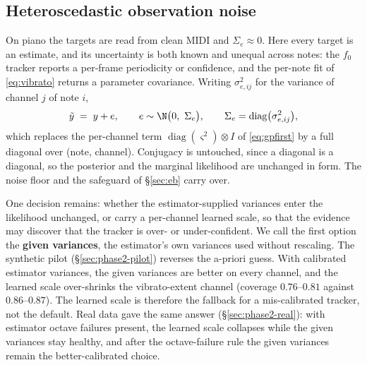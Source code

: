 \subsection{Heteroscedastic observation noise}
On piano the targets are read from clean MIDI and $\Sigma_e \approx 0$.
Here every target is an estimate, and its uncertainty is both known and
unequal across notes: the $f_0$ tracker reports a per-frame periodicity
or confidence, and the per-note fit of \eqref{eq:vibrato} returns a
parameter covariance. Writing $\sigma_{e,ij}^2$ for the variance of
channel $j$ of note $i$,
\begin{equation}
  \tilde y \;=\; y + e, \qquad
  e \sim \N\bigl(0,\ \Sigma_e\bigr), \qquad
  \Sigma_e = \operatorname{diag}\bigl(\sigma_{e,ij}^2\bigr),
  \label{eq:phase2-noise}
\end{equation}
which replaces the per-channel term $\operatorname{diag}(\varsigma^2)\otimes I$ of
\eqref{eq:gpfirst} by a full diagonal over (note, channel). Conjugacy is
untouched, since a diagonal is a diagonal, so the posterior and the
marginal likelihood are unchanged in form. The noise floor and the
safeguard of \S\ref{sec:eb} carry over.

One decision remains: whether the estimator-supplied variances enter the
likelihood unchanged, or carry a per-channel learned scale, so that the
evidence may discover that the tracker is over- or under-confident. We
call the first option the \textbf{given variances}, the estimator's own
variances used without rescaling. The synthetic pilot
(\S\ref{sec:phase2-pilot}) reverses the a-priori guess. With calibrated
estimator variances, the given variances are better on every channel,
and the learned scale over-shrinks the vibrato-extent channel (coverage
$0.76$--$0.81$ against $0.86$--$0.87$). The learned scale is therefore
the fallback for a mis-calibrated tracker, not the default. Real data
gave the same answer (\S\ref{sec:phase2-real}): with estimator octave
failures present, the learned scale collapses while the given variances
stay healthy, and after the octave-failure rule the given variances
remain the better-calibrated choice.

